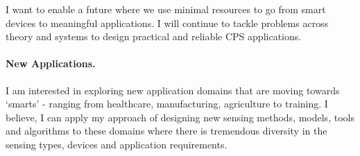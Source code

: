 \documentclass[10pt]{article}
\begin{document}
I want to enable a future where we use minimal resources to go from smart devices to meaningful applications. I will continue to tackle problems across theory and systems to design practical and reliable CPS applications.%




\paragraph{New Applications. }
I am interested in exploring new application domains that are moving towards `smarts' - ranging from healthcare, manufacturing, agriculture to training. I believe, I can apply my approach of designing new sensing methods, models, tools and algorithms to these domains where there is tremendous diversity in the sensing types, devices and application requirements. %

\end{document}

